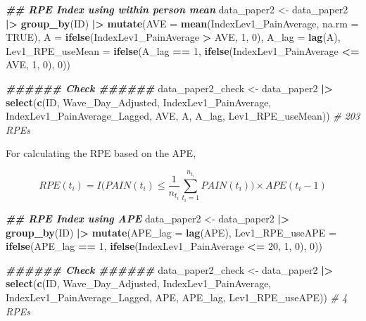 \documentclass[
  12pt,
]{article}
\newenvironment{Shaded}{\begin{snugshade}}{\end{snugshade}}
\newcommand{\AttributeTok}[1]{\textcolor[rgb]{0.13,0.29,0.53}{#1}}
\newcommand{\CommentTok}[1]{\textcolor[rgb]{0.56,0.35,0.01}{\textit{#1}}}
\newcommand{\ConstantTok}[1]{\textcolor[rgb]{0.56,0.35,0.01}{#1}}
\newcommand{\DecValTok}[1]{\textcolor[rgb]{0.00,0.00,0.81}{#1}}
\newcommand{\DocumentationTok}[1]{\textcolor[rgb]{0.56,0.35,0.01}{\textbf{\textit{#1}}}}
\newcommand{\FunctionTok}[1]{\textcolor[rgb]{0.13,0.29,0.53}{\textbf{#1}}}
\newcommand{\NormalTok}[1]{#1}
\newcommand{\OtherTok}[1]{\textcolor[rgb]{0.56,0.35,0.01}{#1}}
\newcommand{\SpecialCharTok}[1]{\textcolor[rgb]{0.81,0.36,0.00}{\textbf{#1}}}
\begin{document}
\begin{Shaded}
\begin{Highlighting}[]
\DocumentationTok{\#\# RPE Index using within person mean}
\NormalTok{data\_paper2 }\OtherTok{\textless{}{-}}\NormalTok{ data\_paper2 }\SpecialCharTok{|\textgreater{}}
  \FunctionTok{group\_by}\NormalTok{(ID) }\SpecialCharTok{|\textgreater{}}
  \FunctionTok{mutate}\NormalTok{(}\AttributeTok{AVE =} \FunctionTok{mean}\NormalTok{(IndexLev1\_PainAverage, }\AttributeTok{na.rm =} \ConstantTok{TRUE}\NormalTok{),}
         \AttributeTok{A =} \FunctionTok{ifelse}\NormalTok{(IndexLev1\_PainAverage }\SpecialCharTok{\textgreater{}}\NormalTok{ AVE, }\DecValTok{1}\NormalTok{, }\DecValTok{0}\NormalTok{),}
         \AttributeTok{A\_lag =} \FunctionTok{lag}\NormalTok{(A),}
         \AttributeTok{Lev1\_RPE\_useMean =} \FunctionTok{ifelse}\NormalTok{(A\_lag }\SpecialCharTok{==} \DecValTok{1}\NormalTok{, }
                                   \FunctionTok{ifelse}\NormalTok{(IndexLev1\_PainAverage }\SpecialCharTok{\textless{}=}\NormalTok{ AVE, }\DecValTok{1}\NormalTok{, }\DecValTok{0}\NormalTok{), }\DecValTok{0}\NormalTok{)) }

\DocumentationTok{\#\#\#\#\#\# Check \#\#\#\#\#\#}
\NormalTok{data\_paper2\_check }\OtherTok{\textless{}{-}}\NormalTok{ data\_paper2 }\SpecialCharTok{|\textgreater{}}
  \FunctionTok{select}\NormalTok{(}\FunctionTok{c}\NormalTok{(ID, Wave\_Day\_Adjusted, IndexLev1\_PainAverage, IndexLev1\_PainAverage\_Lagged, }
\NormalTok{           AVE, A, A\_lag, Lev1\_RPE\_useMean))}
\CommentTok{\# 203 RPEs}
\end{Highlighting}
\end{Shaded}

For calculating the RPE based on the APE,

\[
RPE(t_i)=I\Big(PAIN(t_i)\leq \frac{1}{n_{t_i}}\sum_{t_i=1}^{n_{t_i}}PAIN(t_i)\Big)\times APE(t_i-1)
\]

\begin{Shaded}
\begin{Highlighting}[]
\DocumentationTok{\#\# RPE Index using APE}
\NormalTok{data\_paper2 }\OtherTok{\textless{}{-}}\NormalTok{ data\_paper2 }\SpecialCharTok{|\textgreater{}}
  \FunctionTok{group\_by}\NormalTok{(ID) }\SpecialCharTok{|\textgreater{}}
  \FunctionTok{mutate}\NormalTok{(}\AttributeTok{APE\_lag =} \FunctionTok{lag}\NormalTok{(APE), }
         \AttributeTok{Lev1\_RPE\_useAPE =} \FunctionTok{ifelse}\NormalTok{(APE\_lag }\SpecialCharTok{==} \DecValTok{1}\NormalTok{, }
                                   \FunctionTok{ifelse}\NormalTok{(IndexLev1\_PainAverage }\SpecialCharTok{\textless{}=} \DecValTok{20}\NormalTok{, }\DecValTok{1}\NormalTok{, }\DecValTok{0}\NormalTok{), }\DecValTok{0}\NormalTok{)) }

\DocumentationTok{\#\#\#\#\#\# Check \#\#\#\#\#\#}
\NormalTok{data\_paper2\_check }\OtherTok{\textless{}{-}}\NormalTok{ data\_paper2 }\SpecialCharTok{|\textgreater{}}
  \FunctionTok{select}\NormalTok{(}\FunctionTok{c}\NormalTok{(ID, Wave\_Day\_Adjusted, IndexLev1\_PainAverage, IndexLev1\_PainAverage\_Lagged, }
\NormalTok{           APE, APE\_lag, Lev1\_RPE\_useAPE))}
\CommentTok{\# 4 RPEs}
\end{Highlighting}
\end{Shaded}
\end{document}
